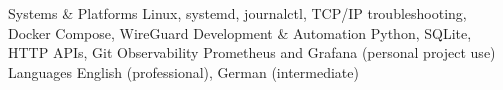 
\begin{cvskills}
  \cvskill
    {Systems \& Platforms}
    {Linux, systemd, journalctl, TCP/IP troubleshooting, Docker Compose, WireGuard}
  \cvskill
    {Development \& Automation}
    {Python, SQLite, HTTP APIs, Git}
  \cvskill
    {Observability}
    {Prometheus and Grafana (personal project use)}
  \cvskill
    {Languages}
    {English (professional), German (intermediate)}
\end{cvskills}
